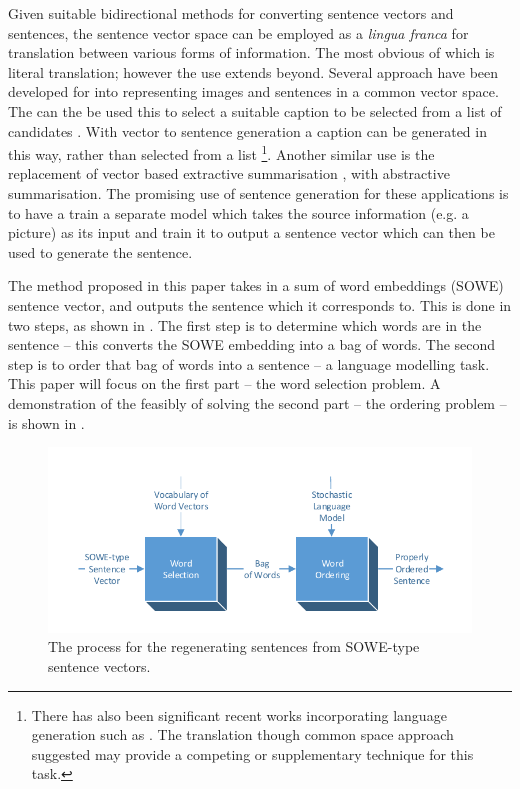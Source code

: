 \documentclass[11pt]{article}
\numberwithin{equation}{section}
\numberwithin{figure}{section}
\theoremstyle{plain}
\theoremstyle{definition}
\begin{document}
Given suitable bidirectional methods for converting sentence vectors and sentences, the sentence vector space can be employed as a \emph{lingua franca} for translation between various forms of information. The most obvious of which is literal translation; however the use extends beyond. Several approach have been developed for into representing images and sentences in a common vector space. The can the be used this to select a suitable caption to be selected from a list of candidates \parencite{farhadi2010every,socherDTRNN}. With vector to sentence generation a caption can be generated in this way, rather than selected from a list \footnote{There has also been significant recent works incorporating language generation such as \textcite{donahue2014long,Mao2014GenerateImageDesc}. The translation though common space approach suggested may provide a competing or supplementary technique for this task.}. Another similar use is the replacement of vector based extractive summarisation \textcite{KaagebExtractiveSummaristation,yogatamaextractive}, with abstractive summarisation. The promising use of sentence generation for these applications is to have a train a separate model which takes the source information (e.g. a picture) as its input and train it to output a sentence vector which can then be used to generate the sentence.


The method proposed in this paper takes in a sum of word embeddings (SOWE) sentence vector, and outputs the sentence which it corresponds to. This is done in two steps, as shown in . The first step is to determine which words are in the sentence -- this converts the SOWE embedding into a bag of words. The second step is to order that bag of words into a sentence -- a language modelling task. This paper will focus on the first part -- the word selection problem. A demonstration of the feasibly of solving the second part -- the ordering problem --  is shown in .

\begin{figure}
	\centering 
	\includegraphics[width=\columnwidth]{block_diagram}
	\caption{The process for the regenerating sentences from SOWE-type sentence vectors.}
	\label{block_diagram}
\end{figure}
\end{document}
